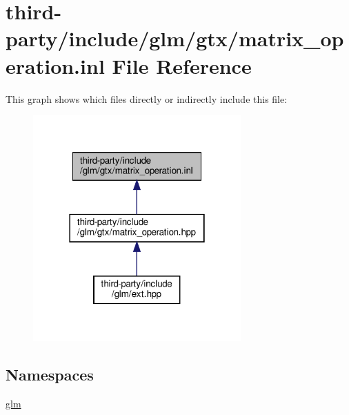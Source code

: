 \hypertarget{matrix__operation_8inl}{}\section{third-\/party/include/glm/gtx/matrix\+\_\+operation.inl File Reference}
\label{matrix__operation_8inl}
This graph shows which files directly or indirectly include this file\+:
\nopagebreak
\begin{figure}[H]
\begin{center}
\leavevmode
\includegraphics[width=226pt]{matrix__operation_8inl__dep__incl}
\end{center}
\end{figure}
\subsection*{Namespaces}
\begin{DoxyCompactItemize}
\item 
 \hyperlink{namespaceglm}{glm}
\end{DoxyCompactItemize}
